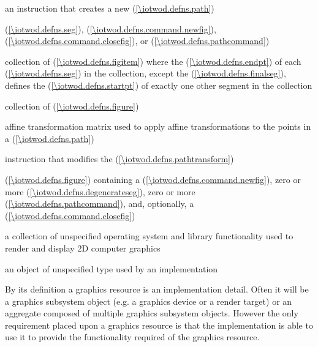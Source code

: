 %
 an instruction that creates a new  (\ref{\iotwod.defns.path})

%
 (\ref{\iotwod.defns.seg}),  (\ref{\iotwod.defns.command.newfig}),  (\ref{\iotwod.defns.command.closefig}), or  (\ref{\iotwod.defns.pathcommand})

%
collection of  (\ref{\iotwod.defns.figitem}) where the  (\ref{\iotwod.defns.endpt}) of each  (\ref{\iotwod.defns.seg}) in the collection, except the  (\ref{\iotwod.defns.finalseg}), defines the  (\ref{\iotwod.defns.startpt}) of exactly one other segment in the collection

%
collection of  (\ref{\iotwod.defns.figure})

%
affine transformation matrix used to apply affine transformations to the points in a  (\ref{\iotwod.defns.path})

%
instruction that modifies the  (\ref{\iotwod.defns.pathtransform})

%
 (\ref{\iotwod.defns.figure}) containing a  (\ref{\iotwod.defns.command.newfig}), zero or more  (\ref{\iotwod.defns.degenerateseg}), zero or more  (\ref{\iotwod.defns.pathcommand}), and, optionally, a  (\ref{\iotwod.defns.command.closefig})

%
a collection of unspecified operating system and library functionality used to render and display 2D computer graphics

%
 an object of unspecified type used by an implementation
\begin{note}
By its definition a graphics resource is an implementation detail. Often it will be a graphics subsystem object (e.g. a graphics device or a render target) or an aggregate composed of multiple graphics subsystem objects. However the only requirement placed upon a graphics resource is that the implementation is able to use it to provide the functionality required of the graphics resource.
\end{note}

